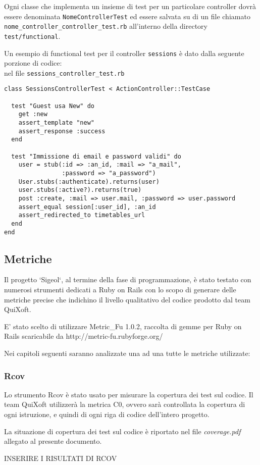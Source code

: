 \documentclass[11pt,a4paper]{article}
\begin{document}
Ogni classe che implementa un insieme di test per un particolare controller dovrà essere denominata \verb|NomeControllerTest| ed essere salvata su di un file chiamato \verb|nome_controller_controller_test.rb| all'interno della directory \verb|test/functional|.

Un esempio di functional test per il controller \verb|sessions| è dato dalla seguente porzione di codice: \\
nel file \verb|sessions_controller_test.rb|
\begin{verbatim}
class SessionsControllerTest < ActionController::TestCase

  test "Guest usa New" do
    get :new
    assert_template "new"
    assert_response :success
  end

  test "Immissione di email e password validi" do
    user = stub(:id => :an_id, :mail => "a_mail",
                :password => "a_password")
    User.stubs(:authenticate).returns(user)
    user.stubs(:active?).returns(true)
    post :create, :mail => user.mail, :password => user.password
    assert_equal session[:user_id], :an_id
    assert_redirected_to timetables_url
  end
end
\end{verbatim}
\subsection{Metriche}
Il progetto `Sigeol`, al termine della fase di programmazione, è stato testato con numerosi strumenti dedicati a Ruby on Rails con lo scopo di generare delle metriche precise che indichino il livello qualitativo del codice prodotto dal team QuiXoft.

E' stato scelto di utilizzare Metric\_Fu 1.0.2, raccolta di gemme per Ruby on Rails scaricabile da http://metric-fu.rubyforge.org/

Nei capitoli seguenti saranno analizzate una ad una tutte le metriche utilizzate:
\subsubsection{Rcov}
Lo strumento Rcov è stato usato per misurare la copertura dei test sul codice. Il team QuiXoft utilizzerà la metrica C0, ovvero sarà controllata la copertura di ogni istruzione, e quindi di ogni riga di codice dell'intero progetto.

La situazione di copertura dei test sul codice è riportato nel file \textit{coverage.pdf} allegato al presente documento.

\begin{large}INSERIRE I RISULTATI DI RCOV\end{large}
\end{document}
